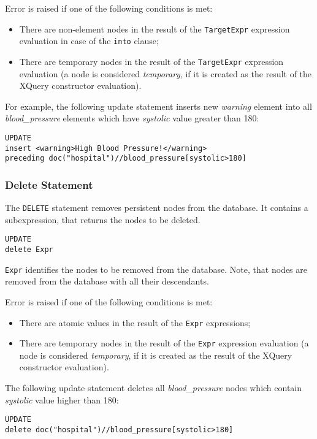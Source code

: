 \documentclass[a4paper,12pt]{article}
\begin{document}
Error is raised if one of the following conditions is met:
\begin{itemize}
\item There are non-element nodes in the result of the \verb!TargetExpr!
expression evaluation in case of the \verb!into! clause;
\item There are temporary nodes in the result of the \verb!TargetExpr!
expression evaluation (a node is considered \emph{temporary}, if it is created
as the result of the XQuery constructor evaluation).
\end{itemize}

For example, the following update statement inserts new \emph{warning} element
into all \emph{blood\_pressure} elements which have \emph{systolic} value
greater than 180:

\begin{verbatim}
UPDATE
insert <warning>High Blood Pressure!</warning>
preceding doc("hospital")//blood_pressure[systolic>180]
\end{verbatim}


\subsubsection*{Delete Statement}
The \verb!DELETE! statement removes persistent nodes from the database. It
contains a subexpression, that returns the nodes to be deleted.

\begin{verbatim}
UPDATE
delete Expr
\end{verbatim}
\verb!Expr! identifies the nodes to be removed from the database. Note, that
nodes are removed from the database with all their descendants.

Error is raised if one of the following conditions is met:
\begin{itemize}
\item There are atomic values in the result of the \verb!Expr! expressions;
\item There are temporary nodes in the result of the \verb!Expr! expression
evaluation (a node is considered \emph{temporary}, if it is created as the
result of the XQuery constructor evaluation).
\end{itemize}

The following update statement deletes all \emph{blood\_pressure} nodes which
contain \emph{systolic} value higher than 180:

\begin{verbatim}
UPDATE
delete doc("hospital")//blood_pressure[systolic>180]
\end{verbatim}
\end{document}
